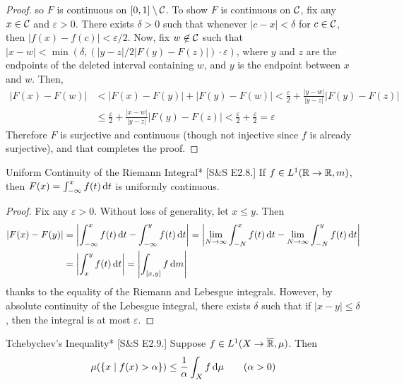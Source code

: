 \begin{proof}
    so \(F\) is continuous on \([0,1] \setminus \mathcal{C}\). To show \(F\) is continuous on \(\mathcal{C}\), fix any \(x \in \mathcal{C}\) and \(\varepsilon > 0\). There exists \(\delta > 0\) such that whenever \(|c - x| < \delta\) for \(c \in \mathcal{C}\), then \(|f(x) - f(c)| < \varepsilon / 2\). Now, fix \(w \not\in \mathcal{C}\) such that \(|x - w| < \min(\delta, (|y - z| / 2|F(y) - F(z)|) \cdot \varepsilon)\), where \(y\) and \(z\) are the endpoints of the deleted interval containing \(w\), and \(y\) is the endpoint between \(x\) and \(w\). Then, 
    \begin{align*}
        |F(x) - F(w)|
        &< |F(x) - F(y)| + |F(y) - F(w)|
        < \frac{\varepsilon}{2} + \frac{|y - w|}{|y - z|} |F(y) - F(z)| \\
        &\leq \frac{\varepsilon}{2} + \frac{|x -w|}{|y - z|} |F(y) - F(z)|
        < \frac{\varepsilon}{2} + \frac{\varepsilon}{2} 
        = \varepsilon
    \end{align*}
    Therefore \(F\) is surjective and continuous (though not injective since \(f\) is already surjective), and that completes the proof. 
\end{proof}

\begin{problem}{Uniform Continuity of the Riemann Integral}*
    [S\&S E2.8.] If \(f \in L^1(\mathbb{R} \to \mathbb{R}, m)\), then \(F(x) = \int_{-\infty}^x f(t) \, \mathrm{d}t\) is uniformly continuous.
\end{problem}

\begin{proof}
    Fix any \(\varepsilon > 0\). Without loss of generality, let \(x \leq y\). Then
    \begin{align*}
        |F(x) - F(y)| 
        &= \left| \int_{-\infty}^x f(t) \, \mathrm{d}t - \int_{-\infty}^y f(t) \, \mathrm{d}t \right| 
        = \left| \lim_{N \to \infty} \int_{-N}^x f(t) \,\mathrm{d}t - \lim_{N \to \infty} \int_{-N}^y f(t) \, \mathrm{d}t \right|  \\
        &= \left| \int_x^y f(t) \, \mathrm{d}t \right| 
        = \left| \int_{[x, y]} f \, \mathrm{d} m \right| 
    \end{align*}
    thanks to the equality of the Riemann and Lebesgue integrals. However, by absolute continuity of the Lebesgue integral, there exists \(\delta\) such that if \(|x - y| \leq \delta\), then the integral is at most \(\varepsilon\).
\end{proof}

\begin{problem}{Tchebychev's Inequality}*
    [S\&S E2.9.] Suppose \(f \in L^1(X \to \overline{\mathbb{R}}, \mu)\). Then
    \[
    \mu(\{x \mid f(x) > \alpha\}) \leq \frac{1}{\alpha} \int_{X} f \, \mathrm{d}\mu \qquad (\alpha > 0)
    \]
\end{problem}

